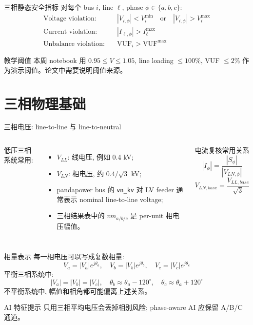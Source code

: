 \documentclass[aspectratio=169,10pt]{ctexbeamer}
\newcommand{\code}[1]{\texttt{#1}}
\begin{document}
\begin{frame}{三相静态安全指标}
对每个 bus $i$, line $\ell$, phase $\phi\in\{a,b,c\}$:
\vspace{0.2em}
\begin{align*}
\text{Voltage violation:}\quad & |V_{i,\phi}| < V_i^{\min} \quad \text{or} \quad |V_{i,\phi}| > V_i^{\max} \\
\text{Current violation:}\quad & |I_{\ell,\phi}| > I_{\ell}^{\max} \\
\text{Unbalance violation:}\quad & \mathrm{VUF}_{i} > \mathrm{VUF}^{\max}
\end{align*}
\vspace{0.2em}
\begin{block}{教学阈值}
本周 notebook 用 $0.95\le V\le1.05$, line loading $\le100\%$, VUF $\le2\%$ 作为演示阈值。论文中需要说明阈值来源。
\end{block}
\end{frame}

\section{三相物理基础}

\begin{frame}{三相电压: line-to-line 与 line-to-neutral}
\begin{columns}[T]
低压三相系统常用:
\begin{itemize}
  \item $V_{LL}$: 线电压, 例如 0.4 kV;
  \item $V_{LN}$: 相电压, 约 $0.4/\sqrt{3}$ kV;
  \item pandapower bus 的 \code{vn\_kv} 对 LV feeder 通常表示 nominal line-to-line voltage;
  \item 三相结果表中的 $vm_{a/b/c}$ 是 per-unit 相电压幅值。
\end{itemize}
\begin{block}{电流复核常用关系}
\[
|I_{\phi}|=\frac{|S_{\phi}|}{|V_{LN,\phi}|}
\]
\[
V_{LN,base}=\frac{V_{LL,base}}{\sqrt{3}}
\]
\end{block}
\end{columns}
\end{frame}

\begin{frame}{相量表示}
每一相电压可以写成复数相量:
\[
V_a = |V_a|e^{j\theta_a},\quad
V_b = |V_b|e^{j\theta_b},\quad
V_c = |V_c|e^{j\theta_c}
\]
\vspace{0.3em}
平衡三相系统中:
\[
|V_a|=|V_b|=|V_c|,\quad
\theta_b\approx\theta_a-120^\circ,\quad
\theta_c\approx\theta_a+120^\circ
\]
\vspace{0.3em}
不平衡系统中, 幅值和相角都可能偏离上述关系。
\begin{alertblock}{AI 特征提示}
只用三相平均电压会丢掉相别风险; phase-aware AI 应保留 A/B/C 通道。
\end{alertblock}
\end{frame}
\end{document}
